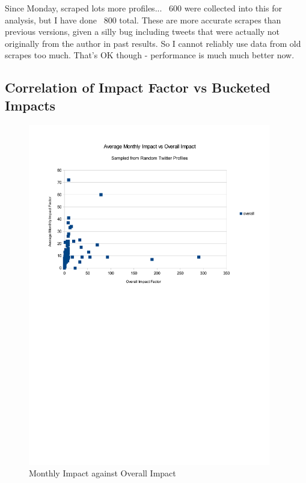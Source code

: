 Since Monday, scraped lots more profiles... ~600 were collected into this for analysis, but I have done ~800 total. These are more accurate scrapes than previous versions, given a silly bug including tweets that were actually not originally from the author in past results. So I cannot reliably use data from old scrapes too much. That's OK though - performance is much much better now. 

\subsection{Correlation of Impact Factor vs Bucketed Impacts}

\begin{figure}[h!]
\centering
\includegraphics[width=400px]{Images/monthly_impact_vs_overallv2.pdf}
\caption{Monthly Impact against Overall Impact}
\end{figure}

